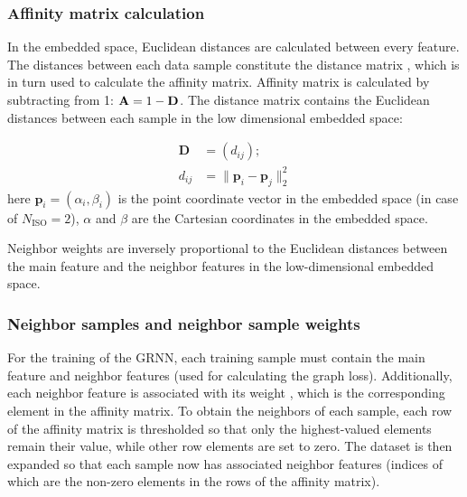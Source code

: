 \documentclass[applsci,article,submit,moreauthors,pdftex]{Definitions/mdpi}
\begin{document}
\subsubsection{Affinity matrix calculation}
In the embedded space, Euclidean distances are calculated between every feature. The distances between each data sample constitute the distance matrix \distancematrix, which is in turn used to calculate the affinity matrix.
Affinity matrix \affinitymatrix{} is calculated by subtracting \distancematrix{} from 1: $ \mathbf{A} = 1 - \mathbf{D} $. The distance matrix contains the Euclidean distances between each sample in the low dimensional embedded space:

\begin{align}
	\mathbf{D} &= (d_{ij});\\
	d_{ij} &= \lVert \mathbf{p}_{i}-\mathbf{p}_{j} \rVert _{2}^{2}
\end{align}
here $ \mathbf{p}_{i} = (\alpha_i, \beta_i) $ is the point coordinate vector in the embedded space (in case of $ N_{\mathrm{ISO}} = 2 $), $ \alpha $ and $ \beta $ are the Cartesian coordinates in the embedded space.

Neighbor weights are inversely proportional to the Euclidean distances between the main feature and the neighbor features in the low-dimensional embedded space.

\subsubsection{Neighbor samples and neighbor sample weights}
For the training of the GRNN, each training sample must contain the main \srpphat{} feature and \gnbrs{} neighbor \srpphat{} features (used for calculating the graph loss). Additionally, each neighbor feature is associated with its weight \nbrweigth{}, which is the corresponding element in the affinity matrix.
To obtain the \gnbrs{} neighbors of each sample, each row of the affinity matrix is thresholded so that only the \gnbrs{} highest-valued elements remain their value, while other row elements are set to zero.
The dataset is then expanded so that each sample now has associated neighbor \srpphat{} features (indices of which are the non-zero elements in the rows of the affinity matrix). 
\end{document}
